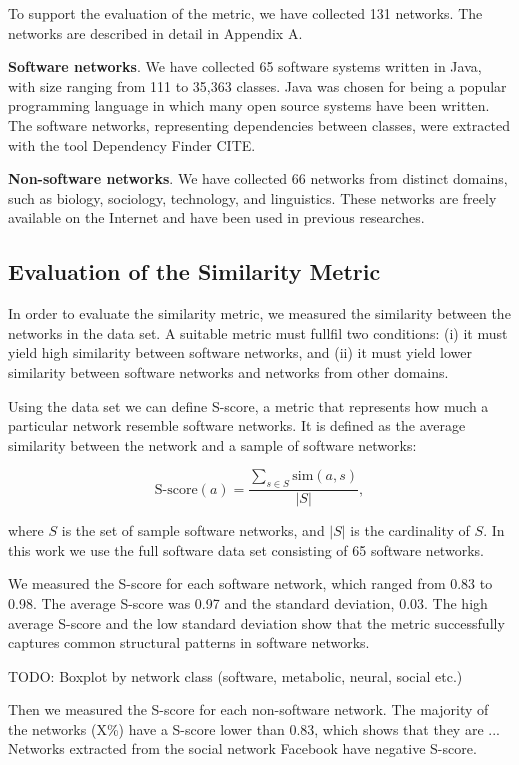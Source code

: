 To support the evaluation of the metric, we have collected 131 networks. The
networks are described in detail in Appendix A.

\textbf{Software networks}. We have collected 65 software systems written in
Java, with size ranging from 111 to 35,363 classes. Java was chosen for being a
popular programming language in which many open source systems have been
written. The software networks, representing dependencies between classes, were
extracted with the tool Dependency Finder CITE.

\textbf{Non-software networks}. We have collected 66 networks from distinct
domains, such as biology, sociology, technology, and linguistics. These networks
are freely available on the Internet and have been used in previous researches.


\subsection{Evaluation of the Similarity Metric}

In order to evaluate the similarity metric, we measured the similarity between
the networks in the data set. A suitable metric must fullfil two conditions: (i)
it must yield high similarity between software networks, and (ii) it must yield
lower similarity between software networks and networks from other domains.

Using the data set we can define S-score, a metric that represents how much a
particular network resemble software networks. It is defined as the average
similarity between the network and a sample of software networks:

$$
\mathrm{S\mbox{-}score}(a) = \frac{
\sum_{s \in S} \mathrm{sim}(a, s)
}{|S|} \mathrm{,}
$$

where $S$ is the set of sample software networks, and $|S|$ is the cardinality
of $S$. In this work we use the full software data set consisting of 65 software
networks.

We measured the S-score for each software network, which ranged from 0.83 to
0.98. The average S-score was 0.97 and the standard deviation, 0.03. The high
average S-score and the low standard deviation show that the metric successfully
captures common structural patterns in software networks.

TODO: Boxplot by network class (software, metabolic, neural, social etc.)

Then we measured the S-score for each non-software network. The majority of the
networks (X\%) have a S-score lower than 0.83, which shows that they
are ... Networks extracted from the social network Facebook have negative
S-score.

